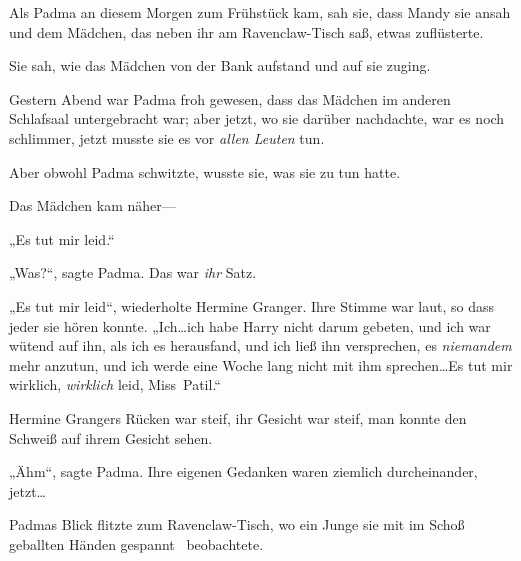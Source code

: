 \later

Als Padma an diesem Morgen zum Frühstück kam, sah sie, dass Mandy sie ansah und dem Mädchen, das neben ihr am Ravenclaw-Tisch saß, etwas zuflüsterte.

Sie sah, wie das Mädchen von der Bank aufstand und auf sie zuging.

Gestern Abend war Padma froh gewesen, dass das Mädchen im anderen Schlafsaal untergebracht war; aber jetzt, wo sie darüber nachdachte, war es noch schlimmer, jetzt musste sie es vor \emph{allen Leuten} tun.

Aber obwohl Padma schwitzte, wusste sie, was sie zu tun hatte.

Das Mädchen kam näher—

„Es tut mir leid.“

„Was?“, sagte Padma. Das war \emph{ihr} Satz.

„Es tut mir leid“, wiederholte Hermine Granger. Ihre Stimme war laut, so dass jeder sie hören konnte. „Ich…ich habe Harry nicht darum gebeten, und ich war wütend auf ihn, als ich es herausfand, und ich ließ ihn versprechen, es \emph{niemandem} mehr anzutun, und ich werde eine Woche lang nicht mit ihm sprechen…Es tut mir wirklich, \emph{wirklich} leid, Miss~Patil.“

Hermine Grangers Rücken war steif, ihr Gesicht war steif, man konnte den Schweiß auf ihrem Gesicht sehen.

„Ähm“, sagte Padma. Ihre eigenen Gedanken waren ziemlich durcheinander, jetzt…

Padmas Blick flitzte zum Ravenclaw-Tisch, wo ein Junge sie mit im Schoß geballten Händen gespannt ~beobachtete.

